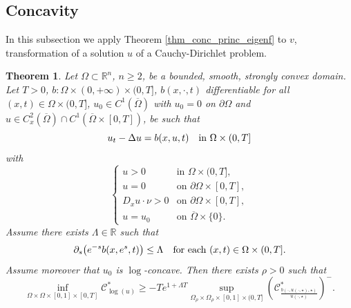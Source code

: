 \documentclass[11pt, reqno]{amsart}
\newtheorem{theorem}[lemma]{Theorem}
\theoremstyle{definition}
\numberwithin{equation}{section}
\newcommand{\Omegabar}{\overline{\Omega}}
\newcommand{\R}{\mathbb{R}}
\newcommand{\mc}[1]{\mathcal{#1}}
\begin{document}
\subsection{Concavity} 

In this subsection we apply Theorem \ref{thm_conc_princ_eigenf} to $v$, transformation of a solution $u$ of a Cauchy-Dirichlet problem.

\begin{theorem}
\label{thm_conc_princ_bound}
	Let $\Omega \subset \R^n$, $n\geq 2$, be a bounded, smooth, strongly convex domain. Let $T>0$, $b\colon \Omega \times (0,+\infty) \times (0,T]$, $b(x,\cdot, t)$ differentiable for all $(x,t)\in \Omega\times (0,T]$, $u_0\in C^1(\Omegabar)$ 	with $u_0=0$ on $\partial\Omega$ and $u \in C^2_x(\Omegabar) \cap 
	C^1(\Omegabar\times[0,T])$, be such that
$$u_t - \Delta u = b(x,u, t) \quad \hbox{in $\Omega \times (0,T]$}$$ 
with
	\begin{equation}\label{boundary T and initial conditions}
		\begin{cases}
				u>0 & \text{in } \Omega\times (0,T],\\
				u=0 & \text{on }\partial \Omega \times[0,T],\\
					D_x u \cdot \nu >0 & \text{on }\partial \Omega\times [0,T], \\
					u =u_0 & \text{on } \Omegabar \times \{0\}.
		\end{cases}
	\end{equation}
Assume there exists $\Lambda \in \R$ such that 
$$\partial_s \big(e^{-s} b(x,e^{s}, t)\big) \leq \Lambda \quad \hbox{for each $(x,t) \in \Omega \times (0,T]$}.$$
Assume moreover that $u_0$ is $\log$-concave. 
Then there exists $\rho>0$ such that
$$\inf_{\Omega \times \Omega \times [0,1] \times [0,T]} \mc{C}^*_{\log(u)} \geq -T e^{1+\Lambda T} \sup_{\Omega_{\rho} \times \Omega_{\rho} \times [0,1] \times (0,T]} \left(\mc{C}^*_{\frac{b(\cdot, u(\cdot, \star), \star)}{u(\cdot,\star)} }\right)^-.$$
\end{theorem}
\end{document}
